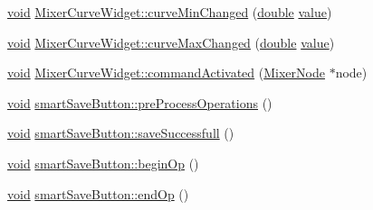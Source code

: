 \begin{DoxyCompactItemize}
\item 
\hyperlink{group___u_a_v_objects_plugin_ga444cf2ff3f0ecbe028adce838d373f5c}{void} \hyperlink{group___u_a_v_object_widget_utils_gac254f263b61538dfab5f1f2a06a7bb12}{Mixer\-Curve\-Widget\-::curve\-Min\-Changed} (\hyperlink{_super_l_u_support_8h_a8956b2b9f49bf918deed98379d159ca7}{double} \hyperlink{glext_8h_aa0e2e9cea7f208d28acda0480144beb0}{value})
\item 
\hyperlink{group___u_a_v_objects_plugin_ga444cf2ff3f0ecbe028adce838d373f5c}{void} \hyperlink{group___u_a_v_object_widget_utils_gabf78aa6aaa393045db87deb6a481c3b1}{Mixer\-Curve\-Widget\-::curve\-Max\-Changed} (\hyperlink{_super_l_u_support_8h_a8956b2b9f49bf918deed98379d159ca7}{double} \hyperlink{glext_8h_aa0e2e9cea7f208d28acda0480144beb0}{value})
\item 
\hyperlink{group___u_a_v_objects_plugin_ga444cf2ff3f0ecbe028adce838d373f5c}{void} \hyperlink{group___u_a_v_object_widget_utils_ga967ede8f3f93e35d68361368d7ce8d49}{Mixer\-Curve\-Widget\-::command\-Activated} (\hyperlink{class_mixer_node}{Mixer\-Node} $\ast$node)
\item 
\hyperlink{group___u_a_v_objects_plugin_ga444cf2ff3f0ecbe028adce838d373f5c}{void} \hyperlink{group___u_a_v_object_widget_utils_ga986b48d4e0086adbba03b2da6178524b}{smart\-Save\-Button\-::pre\-Process\-Operations} ()
\item 
\hyperlink{group___u_a_v_objects_plugin_ga444cf2ff3f0ecbe028adce838d373f5c}{void} \hyperlink{group___u_a_v_object_widget_utils_gafe5d25f2387fdd74204dec872a062f3e}{smart\-Save\-Button\-::save\-Successfull} ()
\item 
\hyperlink{group___u_a_v_objects_plugin_ga444cf2ff3f0ecbe028adce838d373f5c}{void} \hyperlink{group___u_a_v_object_widget_utils_ga84a531cfeea77f9e892321017dbcd705}{smart\-Save\-Button\-::begin\-Op} ()
\item 
\hyperlink{group___u_a_v_objects_plugin_ga444cf2ff3f0ecbe028adce838d373f5c}{void} \hyperlink{group___u_a_v_object_widget_utils_ga2e135b9ad9a743cd1b8b358069ffaf3e}{smart\-Save\-Button\-::end\-Op} ()
\end{DoxyCompactItemize}
